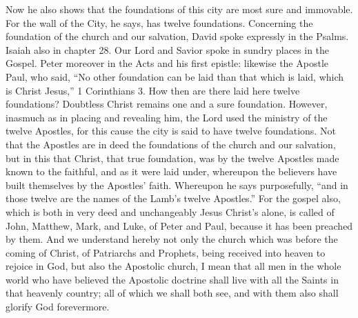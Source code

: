 Now he also shows that the foundations of this city are most sure and immovable. For the wall of the City, he says, has twelve foundations. Concerning the foundation of the church and our salvation, David spoke expressly in the Psalms. Isaiah also in chapter 28. Our Lord and Savior spoke in sundry places in the Gospel. Peter moreover in the Acts and his first epistle: likewise the Apostle Paul, who said, “No other foundation can be laid than that which is laid, which is Christ Jesus,” 1 Corinthians 3. How then are there laid here twelve foundations? Doubtless Christ remains one and a sure foundation. However, inasmuch as in placing and revealing him, the Lord used the ministry of the twelve Apostles, for this cause the city is said to have twelve foundations. Not that the Apostles are in deed the foundations of the church and our salvation, but in this that Christ, that true foundation, was by the twelve Apostles made known to the faithful, and as it were laid under, whereupon the believers have built themselves by the Apostles’ faith. Whereupon he says purposefully, “and in those twelve are the names of the Lamb’s twelve Apostles.” For the gospel also, which is both in very deed and unchangeably Jesus Christ’s alone, is called of John, Matthew, Mark, and Luke, of Peter and Paul, because it has been preached by them. And we understand hereby not only the church which was before the coming of Christ, of Patriarchs and Prophets, being received into heaven to rejoice in God, but also the Apostolic church, I mean that all men in the whole world who have believed the Apostolic doctrine shall live with all the Saints in that heavenly country; all of which we shall both see, and with them also shall glorify God forevermore.

